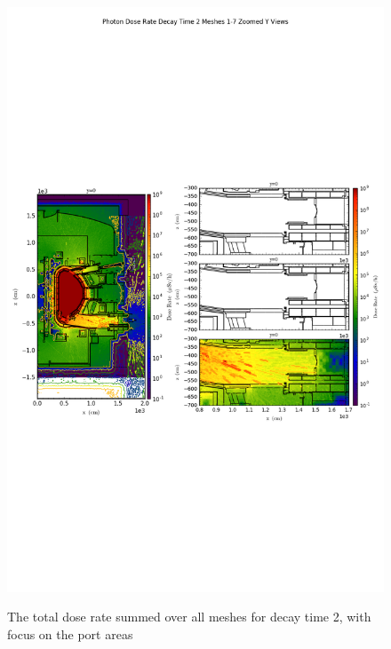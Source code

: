 \documentclass[12pt]{article}
\begin{document}
\begin{figure}[ht!]
\centering
\includegraphics[trim={0cm 9cm 0cm 10cm},clip,scale=0.75]{../plots/final_model/Photon_Dose_Rate_Decay_Time_2_Meshes_1-7_Zoomed_Y_Views.png}
\label{fig:photons_dc2_no4bc_total_zoomed}
\caption{The total dose rate summed over all meshes for decay time 2, with focus on the port areas}
\end{figure}
\end{document}
